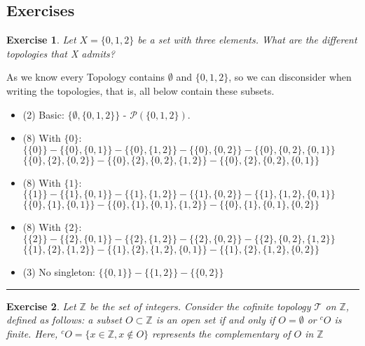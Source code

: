 \documentclass[a4paper,11pt]{article}
\newcommand{\linia}{\rule{\linewidth}{0.5pt}}
\theoremstyle{mytheor}
\theoremstyle{mytheor}
\newtheorem{exercise}{Exercise}
\theoremstyle{remark}
\newcommand{\T}{\mathcal{T}}
\newcommand{\Z}{\mathbb{Z}}
\begin{document}
\subsection{Exercises}

\begin{exercise}
    Let $X = \{0, 1, 2\}$ be a set with three elements. What are the  different topologies that X admits?
\end{exercise}

As we know every Topology contains $\emptyset$ and $\{0,1,2\}$, so we can
disconsider when writing the topologies, that is, all below contain these
subsets. 

\begin{itemize}
    \item (2) Basic: $\{\emptyset, \{0,1,2\}\}$ - $\mathcal{P}(\{0,1,2\})$.  
    \item (8) With $\{0\}$: $\{\{0\}\} - \{\{0\}, \{0,1\}\} - \{\{0\}, \{1,2\}\} -
    \{\{0\}, \{0,2\}\} - \{\{0\}, \{0,2\}, \{0,1\}\}$ \\ 
    $\{\{0\}, \{2\}, \{0,2\}\}- \{\{0\}, \{2\}, \{0,2\}, \{1,2\}\} -
    \{\{0\}, \{2\}, \{0,2\}, \{0,1\}\}$

    \item (8) With $\{1\}$: $\{\{1\}\} - \{\{1\}, \{0,1\}\} - \{\{1\}, \{1,2\}\} -
    \{\{1\}, \{0,2\}\} - \{\{1\}, \{1,2\}, \{0,1\}\}$ \\
    $\{\{0\}, \{1\}, \{0,1\}\} - \{\{0\}, \{1\}, \{0,1\}, \{1,2\}\} -  \{\{0\}, \{1\}, \{0,1\}, \{0,2\}\}$

    \item (8) With $\{2\}$: $\{\{2\}\} - \{\{2\}, \{0,1\}\} - \{\{2\}, \{1,2\}\} -
    \{\{2\}, \{0,2\}\} - \{\{2\}, \{0,2\}, \{1,2\}\}$ \\
    $\{\{1\}, \{2\}, \{1,2\}\} - \{\{1\}, \{2\}, \{1,2\}, \{0,1\}\} - \{\{1\},
    \{2\}, \{1,2\}, \{0,2\}\}$ 
    
    \item (3) No singleton: $\{\{0,1\}\} - \{\{1,2\}\} - \{\{0,2\}\} $
\end{itemize}

\noindent\linia

\begin{exercise}
    Let $\Z$ be the set of integers. Consider the \textit{cofinite
    topology} $\T$ on $\Z$, defined as follows: a subset $O \subset
    \Z$ is an open set if and only if $O = \emptyset$ or $^c O$ is finite. Here, $^cO = \{x \in \Z, x \not\in O\}$ represents the complementary of $O$ in $\Z$
\end{exercise}
\end{document}
